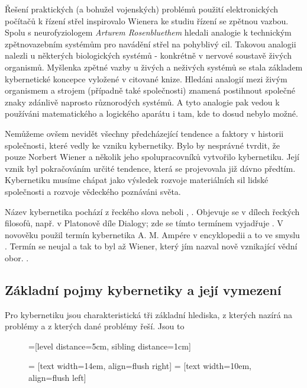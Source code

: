 {    Řešení praktických (a bohužel vojenských) problémů použití elektronických počítačů k řízení 
    střel inspirovalo Wienera ke studiu řízení se zpětnou vazbou. Spolu s neurofyziologem 
    \emph{Arturem Rosenbluethem} hledali analogie k technickým zpětnovazebním systémům pro navádění 
    střel na pohyblivý cil. Takovou analogii nalezli u některých biologických systémů - konkrétně v 
    nervové soustavě živých organismů. Myšlenka zpětné vazby u živých a neživých systémů se stala 
    základem kybernetické koncepce vyložené v citované knize. Hledáni analogií mezi živým 
    organismem a strojem (případně také společnosti) znamená postihnout společné znaky zdánlivě 
    naprosto různorodých systémů. A tyto analogie pak vedou k používáni matematického a logického 
    aparátu i tam, kde to dosud nebylo možné.
    
    Nemůžeme ovšem nevidět všechny předcházející tendence a faktory v historii společnosti, které 
    vedly ke vzniku kybernetiky. Bylo by nesprávné tvrdit, že pouze Norbert Wiener a několik jeho 
    spolupracovníků vytvořilo kybernetiku. Její vznik byl pokračováním určité tendence, která se 
    projevovala již dávno předtím. Kybernetiku musíme chápat jako výsledek rozvoje materiálních sil 
    lidské společnosti a rozvoje vědeckého poznáváni světa.
    
    Název kybernetika pochází z řeckého slova  neboli , . Objevuje se v dílech řeckých filosofů, např. v Platonově díle Dialogy; zde se 
    tímto termínem vyjadřuje . V 
    novověku použil termín kybernetika A. M. Ampére v encyklopedii a to ve smyslu . Termín se neujal a tak to byl až Wiener, který jím nazval nově vznikající vědní 
    obor. \cite[s.~6]{Svarc1986}.

    \subsection{Základní pojmy kybernetiky a její vymezení}
      Pro kybernetiku jsou charakteristická tři základní hlediska, z kterých nazírá na problémy a z 
      kterých dané problémy řeší. Jsou to      
      \begin{figure}[ht!]
        \centering
        =[level distance=5cm, sibling distance=1cm]
        
         = [text width=14em, align=flush right]
         = [text width=10em, align=flush left]
        

\end{figure}}
